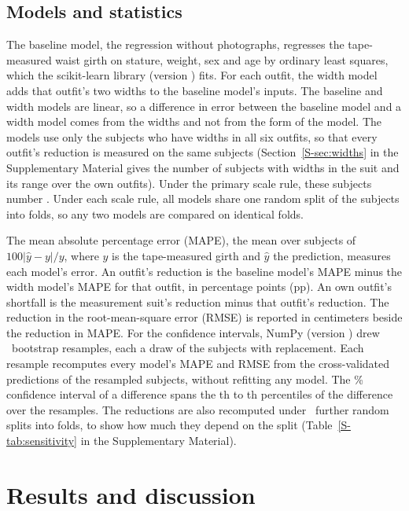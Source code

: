 \documentclass[12pt]{article}
\begin{document}
\subsection{Models and statistics}\label{sec:models}

The baseline model, the regression without photographs, regresses the tape-measured waist girth on stature, weight, sex and age by ordinary least squares,
which the scikit-learn library (version \sklearnVersion) fits.\cite{pedregosa2011} For each outfit, the width model
adds that outfit's two widths to the baseline model's inputs. The baseline and width models are linear, so a
difference in error between the baseline model and a width model comes from the widths and not from the form of the
model. The models use only the subjects who have widths in all six outfits, so that
every outfit's reduction is measured on the same subjects (Section~\ref{S-sec:widths} in the Supplementary Material gives the number of subjects with widths in the suit and
its range over the own outfits). Under the primary scale rule, these subjects number \nSubjects. Under each scale rule, all models share one random split of the subjects into folds, so any two models are compared on identical folds.

The mean absolute percentage error (MAPE), the mean over subjects of $100|\hat{y} - y|/y$, where $y$ is the
tape-measured girth and $\hat{y}$ the prediction, measures each model's error. An outfit's reduction is the baseline
model's MAPE minus the width model's MAPE for that outfit, in percentage points (pp). An own outfit's shortfall is the
measurement suit's reduction minus that outfit's reduction. The reduction in the root-mean-square error (RMSE) is reported in centimeters beside the reduction in MAPE. For the confidence intervals, NumPy
(version \numpyVersion) drew \nBoot\ bootstrap resamples, each a draw of the subjects with replacement.\cite{harris2020} Each resample recomputes
every model's MAPE and RMSE from the cross-validated predictions of the resampled subjects, without refitting any
model. The \ciLevel\% confidence interval of a difference spans the \ciLowerPct{}th to \ciUpperPct{}th percentiles of
the difference over the resamples.\cite{efron1993} The reductions are also recomputed under \nPartitionSeeds\ further
random splits into folds, to show how much they depend on the split (Table~\ref{S-tab:sensitivity} in the
Supplementary Material).

\section{Results and discussion}\label{sec:results}
\end{document}
